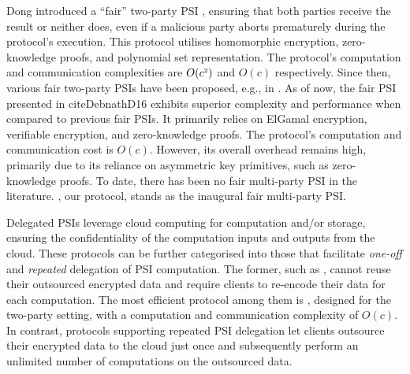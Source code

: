 Dong \et introduced a ``fair'' two-party PSI \cite{DBLP:conf/dbsec/DongCCR13},  ensuring that both parties receive the result or neither does, even if a malicious party aborts prematurely during the protocol's execution. This protocol utilises homomorphic encryption, zero-knowledge proofs, and polynomial set representation. The protocol's  computation and communication complexities are $O(c^{\scriptscriptstyle 2})$ and $O(c)$  respectively. Since then, various fair two-party PSIs have been proposed, e.g.,  in \cite{DebnathD14,DebnathD16-,DebnathD16}. As of now, the fair PSI presented in cite{DebnathD16} exhibits superior complexity and performance when compared to previous fair PSIs. It primarily relies on ElGamal encryption, verifiable encryption, and zero-knowledge proofs. The protocol's computation and communication cost is $O(c)$. However, its overall overhead remains high, primarily due to its reliance on asymmetric key primitives, such as zero-knowledge proofs. To date, there has been no fair multi-party PSI in the literature. \withFai, our protocol, stands as the inaugural fair multi-party PSI.





Delegated PSIs leverage cloud computing for computation and/or storage, ensuring the confidentiality of the computation inputs and outputs from the cloud. These protocols can be further categorised into those that facilitate \textit{one-off} and \textit{repeated} delegation of PSI computation. The former, such as \cite{kamarascaling,kerschbaum12,c18}, cannot reuse their outsourced encrypted data and require clients to re-encode their data for each computation. The most efficient protocol among them is \cite{kamarascaling}, designed for the two-party setting, with a computation and communication complexity of $O(c)$.  In contrast, protocols supporting repeated PSI delegation let clients outsource their encrypted data to the cloud just once and subsequently perform an unlimited number of computations on the outsourced data.
 
